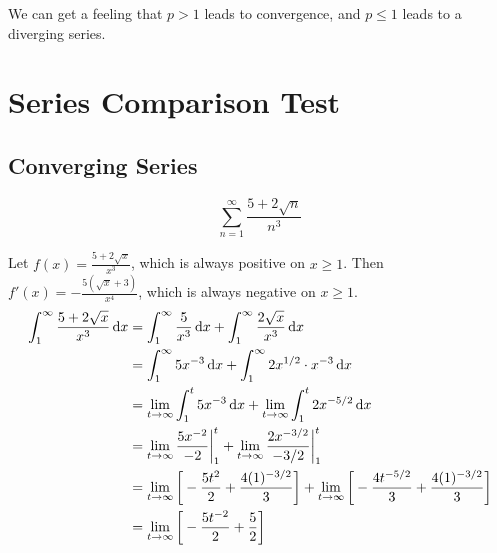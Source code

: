 We can get a feeling that \( p>1 \) leads to convergence, and \(p \leq 1\) leads to a diverging series.

\section{Series Comparison Test}

\subsection{Converging Series}
\begin{ex}\label{ex:convcomp}
  \[ \sum_{n=1}^{\infty} \frac{5+2\sqrt n}{n^3} \]
  \begin{sol}

    Let $f(x)=\frac{5+2\sqrt{x}}{x^3}$, which is always positive on $x\geq 1$.
    Then $f'(x) = -\frac{5(\sqrt{x}+3)}{x^4}$, which is always negative on $x
    \geq 1$.
    \begin{align*}
      \int_1^\infty \frac{5+2\sqrt x}{x^3} \ud x
      &= \int_1^\infty \frac{5}{x^3} \ud x
      + \int_1^\infty \frac{2 \sqrt x}{x^3} \ud x \\
      &= \int_1^\infty 5x^{-3} \ud x
      + \int_1^\infty 2x^{1/2} \cdot x^{-3} \ud x \\
      &= \lim_{t\to\infty} \int_1^t 5x^{-3} \ud x
      +  \lim_{t\to\infty}\int_1^t 2x^{-5/2} \ud x \\
      &= \lim_{t\to\infty}\frac{5x^{-2}}{-2}\bigg|_1^t+
      \lim_{t\to\infty}\frac{2x^{-3/2}}{-3/2}\bigg|_1^t \\
      &= \lim_{t\to\infty} \bigg[-\frac{5t^{2}}{2}+\frac{4(1)^{-3/2}}{3} \bigg]
      + \lim_{t\to\infty}\bigg[ -\frac{4t^{-5/2}}{3} +\frac{4(1)^{-3/2}}{3}
        \bigg] \\
      &=\lim_{t\to\infty} \bigg[-\frac{5t^{-2}}{2}+\frac{5}{2} \bigg]

\end{align*}
\end{sol}
\end{ex}
